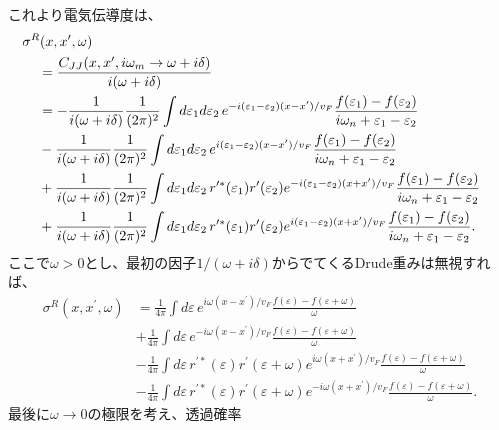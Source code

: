 \documentclass[10pt,a4j]{jarticle}
\begin{document}
これより電気伝導度は、
\begin{align}
& \hspace{-4mm} \sigma^R(x,x^\prime,\omega) \nonumber \\
&= \frac{C_{JJ}(x,x^\prime,i\omega_m\rightarrow \omega + i \delta)}{i(\omega+i\delta)} \nonumber \\
&= - \frac{1}{i(\omega + i\delta) } \frac{1}{(2\pi)^2} \int d\varepsilon_1 d\varepsilon_2 \, 
e^{-i(\varepsilon_1-\varepsilon_2)(x-x^\prime)/v_F}
\frac{f(\varepsilon_1)- f(\varepsilon_2)}{i\omega_n + \varepsilon_1 - \varepsilon_2} \nonumber \\
& - \frac{1}{i(\omega + i\delta)} \frac{1}{(2\pi)^2} \int d\varepsilon_1 d\varepsilon_2 \, 
e^{i(\varepsilon_1-\varepsilon_2)(x-x^\prime)/v_F }
\frac{f(\varepsilon_1)- f(\varepsilon_2)}{i\omega_n + \varepsilon_1 - \varepsilon_2} 
\nonumber \\
& + \frac{1}{i(\omega + i\delta)} \frac{1}{(2\pi)^2} \int d\varepsilon_1 d\varepsilon_2 \, r^{\prime*}(\varepsilon_1)r^\prime(\varepsilon_2) 
e^{-i(\varepsilon_1-\varepsilon_2)(x+x^\prime)/v_F}
\frac{f(\varepsilon_1)- f(\varepsilon_2)}{i\omega_n + \varepsilon_1 - \varepsilon_2} \nonumber \\
& + \frac{1}{i(\omega + i\delta) }\frac{1}{(2\pi)^2} \int d\varepsilon_1 d\varepsilon_2 \, r^{\prime*}(\varepsilon_1)r^\prime(\varepsilon_2) 
e^{i(\varepsilon_1-\varepsilon_2)(x+x^\prime)/v_F }
\frac{f(\varepsilon_1)- f(\varepsilon_2)}{i\omega_n + \varepsilon_1 - \varepsilon_2} .
\end{align}
ここで$\omega > 0$とし、最初の因子$1/(\omega + i\delta)$からでてくるDrude重みは無視すれば、
\begin{align}
\sigma^R(x,x^\prime,\omega) 
&= \frac{1}{4\pi} \int d\varepsilon \, e^{i\omega (x-x^\prime)/v_F} \frac{f(\varepsilon)- f(\varepsilon + \omega)}{\omega} \nonumber \\
& + \frac{1}{4\pi} \int d\varepsilon \, e^{-i\omega (x-x^\prime)/v_F} \frac{f(\varepsilon)- f(\varepsilon + \omega)}{\omega} \nonumber \\
& - \frac{1}{4\pi} \int d\varepsilon \, r^{\prime*}(\varepsilon)r^\prime(\varepsilon+\omega) 
e^{i\omega (x+x^\prime)/v_F}
\frac{f(\varepsilon)- f(\varepsilon + \omega)}{\omega}  \nonumber \\
& - \frac{1}{4\pi} \int d\varepsilon \, r^{\prime*}(\varepsilon)r^\prime(\varepsilon+\omega) 
e^{-i \omega (x+x^\prime)/v_F }
\frac{f(\varepsilon)- f(\varepsilon + \omega)}{\omega}  .
\end{align}
最後に$\omega \rightarrow 0$の極限を考え、透過確率
\end{document}
